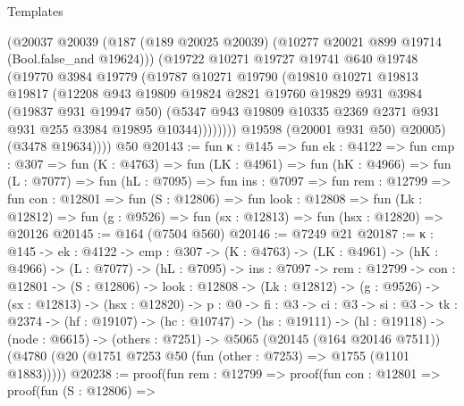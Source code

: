 \begin{lexlean}{Templates}
\begin{coremodule}
              (@20037
                @20039
                (@187 (@189 @20025 @20039) (@10277 @20021 @899 @19714 (Bool.false_and @19624)))
                (@19722
                  @10271
                  @19727
                  @19741
                  @640
                  @19748
                  (@19770
                    @3984
                    @19779
                    (@19787
                      @10271
                      @19790
                      (@19810
                        @10271
                        @19813
                        @19817
                        (@12208
                          @943
                          @19809
                          @19824
                          @2821
                          @19760
                          @19829
                          @931
                          @3984
                          (@19837 @931 @19947 @50)
                          (@5347
                            @943
                            @19809
                            @10335
                            @2369
                            @2371
                            @931
                            @931
                            @255
                            @3984
                            @19895
                            @10344))))))))
            @19598
            (@20001 @931 @50)
            @20005)
          (@3478 @19634))))
    @50
@20143 := fun {κ : @145} =>
  fun {ek : @4122} =>
  fun {cmp : @307} =>
  fun (K : @4763) =>
  fun (LK : @4961) =>
  fun (hK : @4966) =>
  fun (L : @7077) =>
  fun (hL : @7095) =>
  fun {ins : @7097} =>
  fun {rem : @12799} =>
  fun {con : @12801} =>
  fun (S : @12806) =>
  fun {look : @12808} =>
  fun (Lk : @12812) => fun (g : @9526) => fun (sx : @12813) => fun (hsx : @12820) => @20126
@20145 := @164 (@7504 @560)
@20146 := @7249 @21
@20187 := {κ : @145} ->
  {ek : @4122} ->
  {cmp : @307} ->
  (K : @4763) ->
  (LK : @4961) ->
  (hK : @4966) ->
  (L : @7077) ->
  (hL : @7095) ->
  {ins : @7097} ->
  {rem : @12799} ->
  {con : @12801} ->
  (S : @12806) ->
  {look : @12808} ->
  (Lk : @12812) ->
  (g : @9526) ->
  (sx : @12813) ->
  (hsx : @12820) ->
  {p : @0} ->
  {fi : @3} ->
  {ci : @3} ->
  {si : @3} ->
  {tk : @2374} ->
  (hf : @19107) ->
  (hc : @10747) ->
  (hs : @19111) ->
  (hl : @19118) ->
  (node : @6615) ->
  (others : @7251) ->
  @5065
    (@20145 (@164 @20146 @7511))
    (@4780 (@20 (@1751 @7253 @50 (fun (other : @7253) => @1755 (@1101 @1883)))))
@20238 := proof(fun {rem : @12799} =>
    proof(fun {con : @12801} =>
      proof(fun (S : @12806) =>

\end{coremodule}
\end{lexlean}
